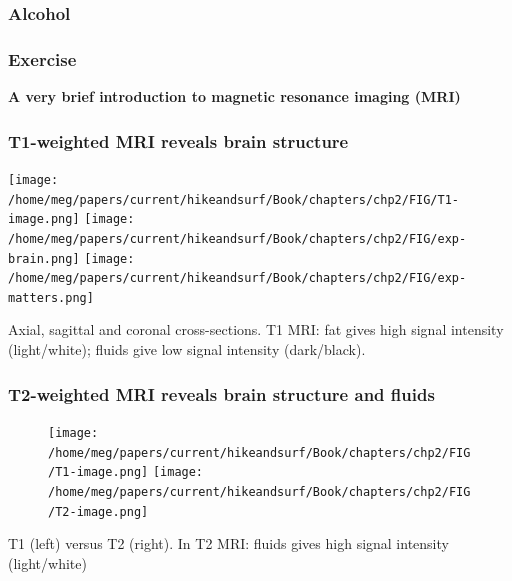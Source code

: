 \documentclass[mathserif, aspectratio=169]{beamer}
\newcommand{\mysection}[1]{\begin{frame} \begin{center} \vspace{3em} \textbf{#1} \end{center} \end{frame}}
\begin{document}
\begin{frame}
  \frametitle{Alcohol}
\end{frame}

\begin{frame}
  \frametitle{Exercise}
\end{frame}

\mysection{A very brief introduction to magnetic resonance imaging (MRI)}

\begin{frame}
  \frametitle{T1-weighted MRI reveals brain structure}
  \begin{center}
  \texttt{[image: /home/meg/papers/current/hikeandsurf/Book/chapters/chp2/FIG/T1-image.png]}
  \texttt{[image: /home/meg/papers/current/hikeandsurf/Book/chapters/chp2/FIG/exp-brain.png]}
  \texttt{[image: /home/meg/papers/current/hikeandsurf/Book/chapters/chp2/FIG/exp-matters.png]}
  \end{center}

  Axial, sagittal and coronal cross-sections. T1 MRI: fat gives high
  signal intensity (light/white); fluids give low signal intensity
  (dark/black).
\end{frame}

\begin{frame}
  \frametitle{T2-weighted MRI reveals brain structure and fluids}
\begin{figure}
  \centering
  \texttt{[image: /home/meg/papers/current/hikeandsurf/Book/chapters/chp2/FIG/T1-image.png]}
  \hspace{2em}
  \texttt{[image: /home/meg/papers/current/hikeandsurf/Book/chapters/chp2/FIG/T2-image.png]}
\end{figure}
T1 (left) versus T2 (right). In T2 MRI: fluids gives high signal intensity (light/white)
\end{frame}
\end{document}
